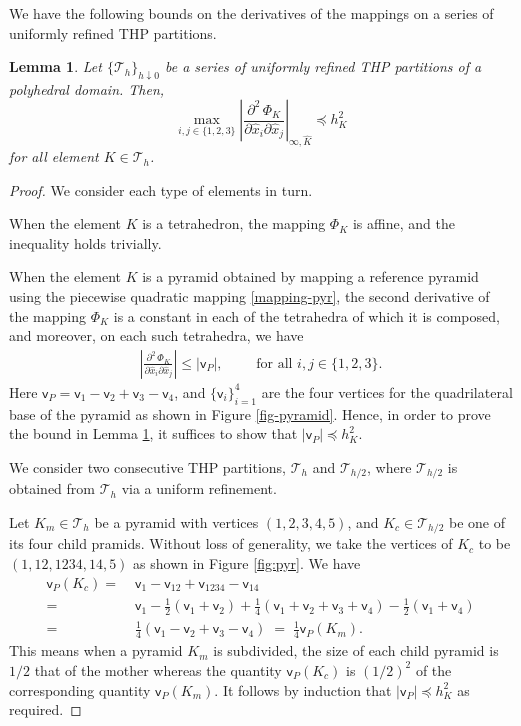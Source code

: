 \documentclass[twoside,reqno,final]{amsart}
\newtheorem{lemma}{Lemma}
\newcommand{\vt}{\mathsf{v}}
\begin{document}
We have the following bounds on the derivatives of the mappings on a series of uniformly refined {\sf THP} partitions.
\begin{lemma}
  \label{lemma-mapping-1}
 Let $\{\mathcal{T}_h\}_{h\downarrow 0}$ be a series of uniformly refined {\sf THP} partitions of a polyhedral domain.
 Then, 
\[
\max_{i,j\in\{1,2,3\}}\left  |\frac{\partial^2\, \Phi_K}{\partial \hat x_i\partial \hat x_j}\right|_{\infty, \widehat K}
\preceq h_K^2
\]
for all element $K\in \mathcal{T}_h$.
\end{lemma}
\begin{proof}
We consider each type of elements in turn.

When the element $K$ is a tetrahedron, the mapping $\Phi_K$ is affine, 
and the inequality holds trivially.

When the element $K$ is a pyramid obtained by mapping a reference pyramid using 
the piecewise quadratic mapping \eqref{mapping-pyr}, 
the second derivative of the mapping $\Phi_K$ is a constant in each of 
the tetrahedra of which it is composed, and moreover, on each such tetrahedra, we have
\begin{align*}
 \left|\frac{\partial^2\, \Phi_K}{\partial \hat x_i\partial \hat x_j}\right|\le |\vt_P|,\quad\quad
 \text{ for all } i,j\in\{1,2,3\}.
\end{align*}
Here $\vt_P =\vt_{1}-\vt_{2}+\vt_3-\vt_4$, and $\{\vt_i\}_{i=1}^4$ are the four vertices for the quadrilateral base
of the pyramid as shown in Figure \ref{fig-pyramid}.
Hence, in order to prove the bound in Lemma \ref{lemma-mapping-1}, it suffices to show that $|\vt_P|\preceq h_K^2$.

We consider two consecutive {\sf THP} partitions, $\mathcal{T}_h$ and $\mathcal{T}_{h/2}$, where 
$\mathcal{T}_{h/2}$ is obtained from $\mathcal{T}_h$ via a uniform refinement.

Let $K_{m}\in \mathcal{T}_h$ be a pyramid with vertices $(1,2,3,4,5)$, and 
$K_{c}\in \mathcal{T}_{h/2}$ be one of its four child pramids.
Without loss of generality, we take the vertices of $K_{c}$ to be 
$
 (1, 12,1234,14,5)$
as shown in Figure \ref{fig:pyr}.
We have 
\begin{align*}
  \vt_P(K_c) = &\;
  \vt_{1} - \vt_{12} + 
 \vt_{1234}-\vt_{14}\\
 = &\; \vt_{1}-\frac{1}{2}(\vt_{1}+\vt_{2})  +\frac{1}{4}(\vt_{1}+\vt_{2}+\vt_3+\vt_4)
 - \frac12(\vt_{1}+\vt_{4})\\
 = &\;\frac{1}{4}(\vt_{1}-\vt_{2}+\vt_3-\vt_4)\;= \;\frac{1}{4}\vt_P(K_m).
\end{align*}
This means when a pyramid $K_m$ is subdivided, the size of each child pyramid is $1/2$ that of the mother whereas
the quantity $\vt_P(K_c)$ is $(1/2)^2$ of the corresponding quantity $\vt_P(K_m)$. It follows by induction that 
$|\vt_P|\preceq h_K^2$ as required.



\end{proof}
\end{document}
